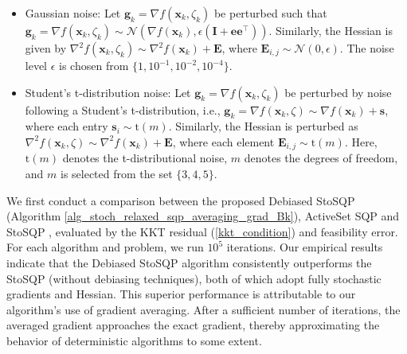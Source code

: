 \documentclass[aos]{imsart}
\numberwithin{equation}{section}
\theoremstyle{plain}
\newcommand{\michael}[1]{\textcolor{red}{Michael:\ #1}}
\newcommand{\yihang}[1]{\textcolor{blue}{Yihang:\ #1}}
\begin{document}
\begin{itemize}
    \item Gaussian noise: Let $\bm{g}_k = \nabla f(\bm{x}_k, \zeta_k)$ be perturbed such that $\bm{g}_k = \nabla f(\bm{x}_k, \zeta_k) \sim \mathcal{N}(\nabla f(\bm{x}_k), \epsilon (\bm{I} + \bm{e} \bm{e}^{\top}))$. Similarly, the Hessian is given by $\nabla^2 f(\bm{x}_{k}, \zeta_k) \sim \nabla^2 f(\bm{x}_{k}) + \bm{E}$, where $\bm{E}_{i,j} \sim \mathcal{N}(0, \epsilon)$. The noise level $\epsilon$ is chosen from $\{1, 10^{-1}, 10^{-2}, 10^{-4} \}$. 

    \item Student's t-distribution noise: 
    Let $\bm{g}_k = \nabla f(\bm{x}_k, \zeta_k)$ be perturbed by noise following a Student's t-distribution, i.e., $\bm{g}_k = \nabla f(\bm{x}_k, \zeta) \sim \nabla f(\bm{x}_k) +  \bm{s}$, where each entry $\bm{s}_{i} \sim \text{t}(m)$. Similarly, the Hessian is perturbed as $\nabla^2 f(\bm{x}_{k}, \zeta) \sim \nabla^2 f(\bm{x}_{k}) + \bm{E}$, where each element $\bm{E}_{i,j} \sim \text{t}(m)$. Here, $\text{t}(m)$ denotes the t-distributional noise, $m$ denotes the degrees of freedom, and $m$ is selected from the set $\{3, 4, 5\}$.
\end{itemize}
We first conduct a comparison between the proposed Debiased StoSQP (Algorithm \ref{alg_stoch_relaxed_sqp_averaging_grad_Bk}), ActiveSet SQP \cite{na2023inequality} and StoSQP \cite{curtis2023sequential}, evaluated by the KKT residual (\ref{kkt_condition}) and feasibility error. 
For each algorithm and problem, we run $10^5$ iterations. 
Our empirical results indicate that the Debiased StoSQP algorithm consistently outperforms the StoSQP (without debiasing techniques), both of which adopt fully stochastic gradients and Hessian. 
This superior performance is attributable to our algorithm's use of gradient averaging. 
After a sufficient number of iterations, the averaged gradient approaches the exact gradient, thereby approximating the behavior of deterministic algorithms to some extent. 
\end{document}
